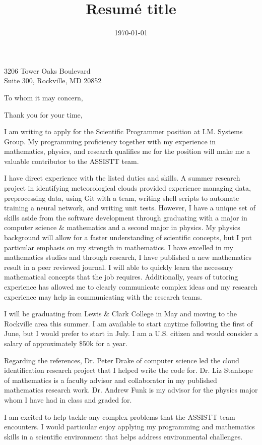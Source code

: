 \documentclass[11pt,letterpaper,roman]{moderncv}        %
\title{Resumé title}                               %
\begin{document}
{3206 Tower Oaks Boulevard\\
Suite 300,
Rockville, MD 20852}
\date{\today}
\opening{To whom it may concern,}
\closing{Thank you for your time,}
\makelettertitle
I am writing to apply for the Scientific Programmer position at I.M. Systems Group. My programming proficiency together with my experience in mathematics, physics, and research qualifies me for the position will make me a valuable contributor to the ASSISTT team.

I have direct experience with the listed duties and skills. A summer research project in identifying meteorological clouds provided experience managing data, preprocessing data, using Git with a team, writing shell scripts to automate training a neural network, and writing unit tests. However, I have a unique set of skills aside from the software development through graduating with a major in computer science \& mathematics and a second major in physics. My physics background will allow for a faster understanding of scientific concepts, but I put particular emphasis on my strength in mathematics. I have excelled in my mathematics studies and through research, I have published a new mathematics result in a peer reviewed journal. I will able to quickly learn the necessary mathematical concepts that the job requires. Additionally, years of tutoring experience has allowed me to clearly communicate complex ideas and my research experience may help in communicating with the research teams.

I will be graduating from Lewis \& Clark College in May and moving to the Rockville area this summer. I am available to start anytime following the first of June, but I would prefer to start in July. I am a U.S. citizen and would consider a salary of approximately \$50k for a year.

Regarding the references, Dr. Peter Drake of computer science led the cloud identification research project that I helped write the code for. Dr. Liz Stanhope of mathematics is a faculty advisor and collaborator in my published mathematics research work. Dr. Andrew Funk is my advisor for the physics major whom I have had in class and graded for.

I am excited to help tackle any complex problems that the ASSISTT team encounters. I would particular enjoy applying my programming and mathematics skills in a scientific environment that helps address environmental challenges.

\vspace{0.5cm}

\makeletterclosing
\end{document}
